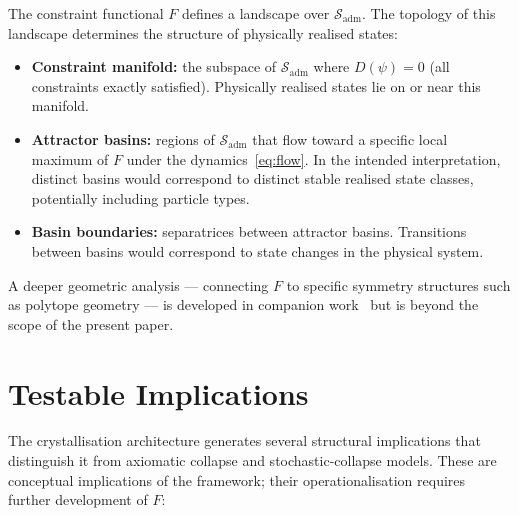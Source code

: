 \documentclass[12pt]{article}
\begin{document}
The constraint functional $F$ defines a landscape over $\mathcal{S}_{\mathrm{adm}}$. The topology of this landscape determines the structure of physically realised states:

\begin{itemize}
    \item \textbf{Constraint manifold:} the subspace of $\mathcal{S}_{\mathrm{adm}}$ where $D(\psi) = 0$ (all constraints exactly satisfied). Physically realised states lie on or near this manifold.
    \item \textbf{Attractor basins:} regions of $\mathcal{S}_{\mathrm{adm}}$ that flow toward a specific local maximum of $F$ under the dynamics~\eqref{eq:flow}. In the intended interpretation, distinct basins would correspond to distinct stable realised state classes, potentially including particle types.
    \item \textbf{Basin boundaries:} separatrices between attractor basins. Transitions between basins would correspond to state changes in the physical system.
\end{itemize}

A deeper geometric analysis --- connecting $F$ to specific symmetry structures such as polytope geometry --- is developed in companion work~\citep{SmartIV, SmartV, SmartXXXVI} but is beyond the scope of the present paper.

\section{Testable Implications}\label{sec:testable}

The crystallisation architecture generates several structural implications that distinguish it from axiomatic collapse and stochastic-collapse models. These are conceptual implications of the framework; their operationalisation requires further development of $F$:
\end{document}
